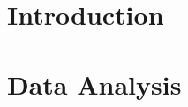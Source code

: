 \documentclass[manuscript]{aastex62}
\begin{document}

\keywords{}





\section{Introduction}

\section{Data Analysis}
\end{document}
